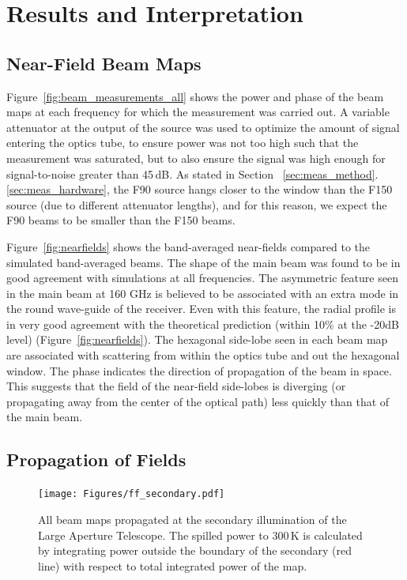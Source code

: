\section{Results and Interpretation}
\label{sec:results}
\subsection{Near-Field Beam Maps}
Figure~\ref{fig:beam_measurements_all} shows the power and phase of the beam maps at each frequency for which the measurement was carried out.   A variable attenuator at the output of the source was used to optimize the amount of signal entering the optics tube, to ensure power was not too high such that the measurement was saturated, but to also ensure the signal was high enough for signal-to-noise greater than 45\,dB.  As stated in Section ~\ref{sec:meas_method}.\ref{sec:meas_hardware}, the F90 source hangs closer to the window than the F150 source (due to different attenuator lengths), and for this reason, we expect the F90 beams to be smaller than the F150 beams.  

Figure~\ref{fig:nearfields} shows the band-averaged near-fields compared to the simulated band-averaged beams.  The shape of the main beam was found to be in good agreement with simulations at all frequencies.  The asymmetric feature seen in the main beam at 160 GHz is believed to be associated with an extra mode in the round wave-guide of the receiver.  Even with this feature, the radial profile is in very good agreement with the theoretical prediction (within 10\% at the -20dB level) (Figure~\ref{fig:nearfields}).   The hexagonal side-lobe seen in each beam map are associated with scattering from within the optics tube and out the hexagonal window.   The phase indicates the direction of propagation of the beam in space.  This suggests that the field of the near-field side-lobes is diverging (or propagating away from the center of the optical path) less quickly than that of the main beam.  

\subsection{Propagation of Fields}
\label{sec:prop_fields}

\begin{figure}[ht]
    \centering
    \texttt{[image: Figures/ff\_secondary.pdf]}
    \caption{All beam maps propagated at the secondary illumination of the Large Aperture Telescope.  The spilled power to 300\,K is calculated by integrating power outside the boundary of the secondary (red line) with respect to total integrated power of the map.}
    \label{fig:secondary}
\end{figure}

